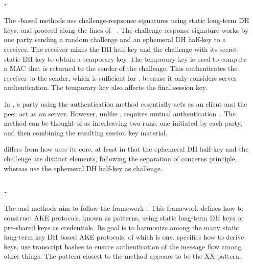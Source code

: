 \spacehack
\subsubsection{\mOptls{}.}
\label{sec:optls}
The \mStat-based methods use challenge-respsonse signatures using static
long-term DH keys, and proceed along the lines of
\mOptls~\cite{DBLP:conf/eurosp/KrawczykW16}.
%
The challenge-response signature works by one party sending a random challenge
and an ephemeral DH half-key to a receiver.
%
The receiver mixes the DH half-key and the challenge with its secret static DH
key to obtain a temporary key.
%
The temporary key is used to compute a MAC that is returned to the sender of the
challenge.
%
This authenticates the receiver to the sender, which is sufficient for \mOptls,
because it only considers server authentication.
%
The temporary key also affects the final session key.
%

In \mEdhoc, a party using the \mStat{} authentication method
essentially acts as an \mOptls{} client and the peer act as an \mOptls{}
server.
%
However, unlike \mOptls{}, \mEdhoc{} requires mutual
authentication~\cite{ietf-lake-reqs-04}.
%
The \mStatStat{} method can be thought of as interleaving two \mOptls{}
runs, one initiated by each party, and then combining the resulting session key
material.
%
%

%
\mOptls{} differs from how \mEdhoc{} uses its core, at least in that the
ephemeral DH half-key and the challenge are distinct elements,
following the separation of concerns principle, whereas \mEdhoc{} use the
ephemeral DH half-key as challenge.
%

\spacehack
\subsubsection{\mNoise{}.}
The \mStatStat{} and \mPskPsk{} methods aim to follow the \mNoise{}
framework~\cite{perrin2016noise}.
%
This framework defines how to construct AKE protocols,
known as patterns, using static long-term DH keys or pre-shared
keys as credentials.
%
Its goal is to harmonize among the many static long-term key DH
based AKE protocols, of which \mOptls{} is one.
%
\mNoise{} specifies how to derive keys, use transcript hashes to ensure
authentication of the message flow among other things.
%
The \mNoise{} pattern closest to the \mStatStat{} method appears to be the
XX pattern.
%

